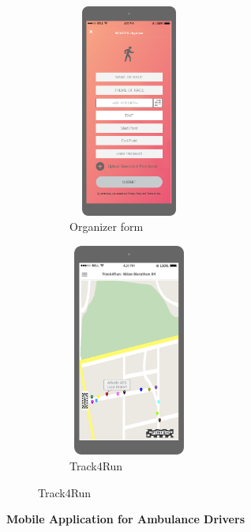 \begin{figure}[H]
	\centering
	\begin{subfigure}[b]{0.4\textwidth}	
		\includegraphics[width=4cm,height=7cm]		{./Mockups/9_T-Oragnizer.png}
      	\caption{Organizer form}
        \label{TrackMe_org}
	 \end{subfigure}
     \begin{subfigure}[b]{0.4\textwidth}	
		\includegraphics[width=4cm,height=7cm]		{./Mockups/9-Track4Run.png}
      	\caption{Track4Run}
        \label{TrackMe_Track4Run}
	 \end{subfigure}
\end{figure}

\textbf{Mobile Application for Ambulance Drivers}

